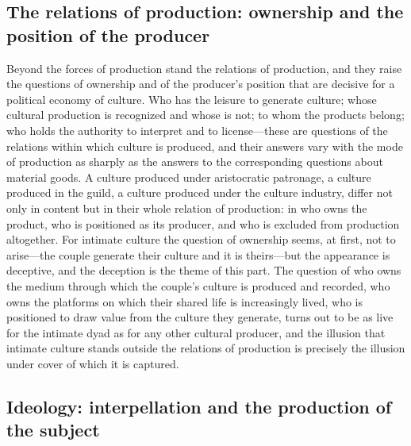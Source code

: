 \subsection*{The relations of production: ownership and the position of the producer}

Beyond the forces of production stand the relations of production, and they raise the questions of ownership and of the producer's position that are decisive for a political economy of culture. Who has the leisure to generate culture; whose cultural production is recognized and whose is not; to whom the products belong; who holds the authority to interpret and to license---these are questions of the relations within which culture is produced, and their answers vary with the mode of production as sharply as the answers to the corresponding questions about material goods. A culture produced under aristocratic patronage, a culture produced in the guild, a culture produced under the culture industry, differ not only in content but in their whole relation of production: in who owns the product, who is positioned as its producer, and who is excluded from production altogether. For intimate culture the question of ownership seems, at first, not to arise---the couple generate their culture and it is theirs---but the appearance is deceptive, and the deception is the theme of this part. The question of who owns the medium through which the couple's culture is produced and recorded, who owns the platforms on which their shared life is increasingly lived, who is positioned to draw value from the culture they generate, turns out to be as live for the intimate dyad as for any other cultural producer, and the illusion that intimate culture stands outside the relations of production is precisely the illusion under cover of which it is captured.

\subsection*{Ideology: interpellation and the production of the subject}

